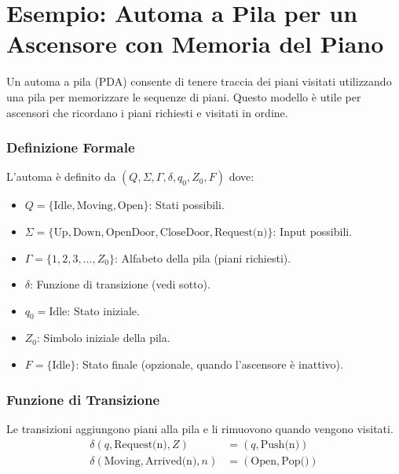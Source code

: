 \documentclass[a4paper,12pt]{report}
\begin{document}
\newpage

\section*{Esempio: Automa a Pila per un Ascensore con Memoria del Piano}
Un automa a pila (PDA) consente di tenere traccia dei piani visitati utilizzando una pila per memorizzare le sequenze di piani. Questo modello è utile per ascensori che ricordano i piani richiesti e visitati in ordine.

\subsubsection*{Definizione Formale}
L'automa è definito da $(Q, \Sigma, \Gamma, \delta, q_0, Z_0, F)$ dove:
\begin{itemize}
    \item $Q = \{\text{Idle}, \text{Moving}, \text{Open}\}$: Stati possibili.
    \item $\Sigma = \{\text{Up}, \text{Down}, \text{OpenDoor}, \text{CloseDoor}, \text{Request(n)}\}$: Input possibili.
    \item $\Gamma = \{\text{1}, \text{2}, \text{3}, \dots, Z_0\}$: Alfabeto della pila (piani richiesti).
    \item $\delta$: Funzione di transizione (vedi sotto).
    \item $q_0 = \text{Idle}$: Stato iniziale.
    \item $Z_0$: Simbolo iniziale della pila.
    \item $F = \{\text{Idle}\}$: Stato finale (opzionale, quando l'ascensore è inattivo).
\end{itemize}

\subsubsection*{Funzione di Transizione}
Le transizioni aggiungono piani alla pila e li rimuovono quando vengono visitati.
\begin{align*}
\delta(q, \text{Request(n)}, Z) &= (q, \text{Push(n)}) \\
\delta(\text{Moving}, \text{Arrived(n)}, n) &= (\text{Open}, \text{Pop()})
\end{align*}
\end{document}
